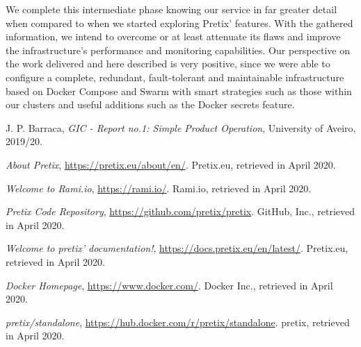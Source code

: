 \documentclass[12pt]{article}
\begin{document}
We complete this intermediate phase knowing our service in far greater detail when compared to when we started exploring Pretix' features.
With the gathered information, we intend to overcome or at least attenuate its flaws and improve the infrastructure's performance and monitoring capabilities.
Our perspective on the work delivered and here described is very positive, since we were able to configure a complete, redundant, fault-tolerant and maintainable 
infrastructure based on Docker Compose and Swarm with smart strategies such as those within our clusters and useful additions such as the Docker secrets feature.

\newpage
\begin{thebibliography}{9} %
  

    J. P. Barraca,
    \textit{GIC - Report no.1: Simple Product Operation},
    University of Aveiro,
    2019/20.
    \vspace{-10pt}

    \textit{About Pretix},
    \url{https://pretix.eu/about/en/}.
    Pretix.eu,
    retrieved in April 2020.
    \vspace{-10pt}

    \textit{Welcome to Rami.io},
    \url{https://rami.io/}.
    Rami.io,
    retrieved in April 2020.
    \vspace{-10pt}

    \textit{Pretix Code Repository},
    \url{https://github.com/pretix/pretix}.
    GitHub, Inc.,
    retrieved in April 2020.
    \vspace{-10pt}

    \textit{Welcome to pretix' documentation!},
    \url{https://docs.pretix.eu/en/latest/}.
    Pretix.eu,
    retrieved in April 2020.
    \vspace{-10pt}

    \textit{Docker Homepage},
    \url{https://www.docker.com/}.
    Docker Inc.,
    retrieved in April 2020.
    \vspace{-26pt}

    \textit{pretix/standalone},
    \url{https://hub.docker.com/r/pretix/standalone}.
    pretix,
    retrieved in April 2020.
    \vspace{-10pt}


\end{thebibliography}
\end{document}
